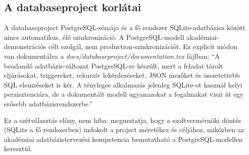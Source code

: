 \subsection{A databaseproject korlátai}

A databaseproject PostgreSQL-sémája és a fő rendszer SQLite-adatbázisa között nincs automatikus, élő szinkronizáció. A PostgreSQL-modell akadémiai-demonstrációs célt szolgál, nem production-szinkronizációt. Ez explicit módon van dokumentálva a \textit{docs/databaseproject/documentation.tex} fájlban: ``A beadandó adatbázis-változat PostgreSQL-re készült, mert a feladat tárolt eljárásokat, triggereket, rekurzív lekérdezéseket, JSON mezőket és összetettebb SQL elemzéseket is kér. A tényleges alkalmazás jelenleg SQLite-ot használ helyi perzisztenciára, de a dokumentált modell ugyanazokat a fogalmakat viszi át egy erősebb adatbázisrendszerbe.''

Ez a szétválasztás előny, nem hiba: megmutatja, hogy a szoftvermérnöki döntés (SQLite a fő rendszerben) indokolt a project méretéhez és céljához, miközben az akadémiai adatbázistervezési kompetencia bemutatható a PostgreSQL-modellen keresztül.

